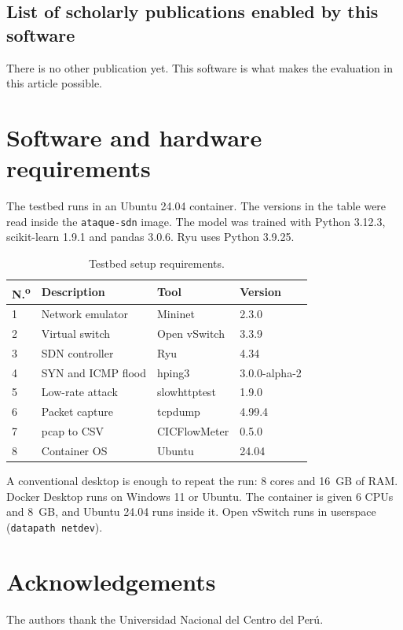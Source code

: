 \documentclass[a4paper,fleqn]{cas-dc}
\begin{document}
\subsection{List of scholarly publications enabled by this software}
There is no other publication yet. This software is what makes the
evaluation in this article possible.

\section{Software and hardware requirements}\label{sec:requirements}

The testbed runs in an Ubuntu 24.04 container. The versions in the
table were read inside the \texttt{ataque-sdn} image. The model was
trained with Python 3.12.3, scikit-learn 1.9.1 and pandas 3.0.6.
Ryu uses Python 3.9.25.

\begin{table}[t]
\footnotesize
\caption{Testbed setup requirements.}\label{tbl:testbed}
\begin{tabular}{@{}p{0.5cm}p{2.3cm}p{1.7cm}p{1.6cm}@{}}
\toprule
N.\textsuperscript{o} & Description & Tool & Version \\
\midrule
1 & Network emulator & Mininet & 2.3.0 \\
2 & Virtual switch & Open vSwitch & 3.3.9 \\
3 & SDN controller & Ryu & 4.34 \\
4 & SYN and ICMP flood & hping3 & 3.0.0-alpha-2 \\
5 & Low-rate attack & slowhttptest & 1.9.0 \\
6 & Packet capture & tcpdump & 4.99.4 \\
7 & pcap to CSV & CICFlowMeter & 0.5.0 \\
8 & Container OS & Ubuntu & 24.04 \\
\bottomrule
\end{tabular}
\end{table}

A conventional desktop is enough to repeat the run: 8 cores and
16~GB of RAM. Docker Desktop runs on Windows 11 or Ubuntu. The
container is given 6 CPUs and 8~GB, and Ubuntu 24.04 runs inside it.
Open vSwitch runs in userspace (\texttt{datapath netdev}).

\section*{Acknowledgements}
The authors thank the Universidad Nacional del Centro del Per\'u.



\end{document}
